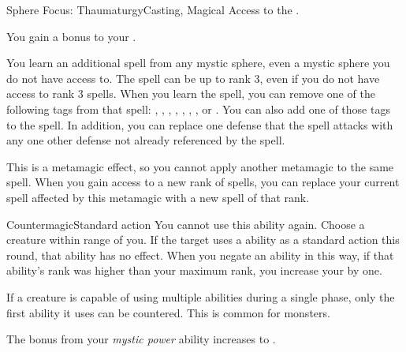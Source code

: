   \begin{magicalfeat}{Sphere Focus: Thaumaturgy}{Casting, Magical}
    \featpre Access to the  .

     You gain a  bonus to your .

     You learn an additional spell from any mystic sphere, even a mystic sphere you do not have access to.
    The spell can be up to rank 3, even if you do not have access to rank 3 spells.
    When you learn the spell, you can remove one of the following tags from that spell: \atAcid, \atAuditory, \atCold, \atCompulsion, \atEmotion, \atElectricity, \atFire, or \atVisual.
    You can also add one of those tags to the spell.
    In addition, you can replace one defense that the spell attacks with any one other defense not already referenced by the spell.

    This is a metamagic effect, so you cannot apply another metamagic to the same spell.
    When you gain access to a new rank of spells, you can replace your current spell affected by this metamagic with a new spell of that rank.

    \begin{magicalactiveability}{Countermagic}{Standard action}
      \abilitytags {}
      \abilitycost You  cannot use this ability again.
      \rankline
      Choose a creature within \rngmed range of you.
      If the target uses a \magical ability as a standard action this round, that ability has no effect.
      When you negate an ability in this way, if that ability's rank was higher than your maximum rank, you increase your  by one.

      If a creature is capable of using multiple abilities during a single phase, only the first ability it uses can be countered.
      This is common for  monsters.
    \end{magicalactiveability}

     The bonus from your \textit{mystic power} ability increases to .
  \end{magicalfeat}

